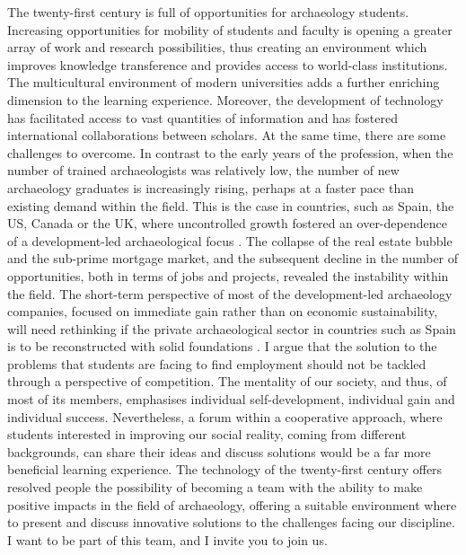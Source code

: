 The twenty-first century is full of opportunities for archaeology students. Increasing opportunities for mobility of students and faculty is opening a greater array of work and research possibilities, thus creating an environment which improves knowledge transference and provides access to world-class institutions. The multicultural environment of modern universities adds a further enriching dimension to the learning experience. Moreover, the development of technology has facilitated access to vast quantities of information and has fostered international collaborations between scholars. At the same time, there are some challenges to overcome. In contrast to the early years of the profession, when the number of trained archaeologists was relatively low, the number of new archaeology graduates is increasingly rising, perhaps at a faster pace than existing demand within the field. This is the case in countries, such as Spain, the US, Canada or the UK, where uncontrolled growth fostered an over-dependence of a development-led archaeological focus \parencite{Aitchison_2009}. The collapse of the real estate bubble and the sub-prime mortgage market, and the subsequent decline in the number of opportunities, both in terms of jobs and projects, revealed the instability within the field. The short-term perspective of most of the development-led archaeology companies, focused on immediate gain rather than on economic sustainability, will need rethinking if the private archaeological sector in countries such as Spain is to be reconstructed with solid foundations \parencite{Hamilakis_2015}. I argue that the solution to the problems that students are facing to find employment should not be tackled through a perspective of competition. The mentality of our society, and thus, of most of its members, emphasises individual self-development, individual gain and individual success. Nevertheless, a forum within a cooperative approach, where students interested in improving our social reality, coming from different backgrounds, can share their ideas and discuss solutions would be a far more beneficial learning experience. The technology of the twenty-first century offers resolved people the possibility of becoming a team with the ability to make positive impacts in the field of archaeology, offering a suitable environment where to present and discuss innovative solutions to the challenges facing our discipline. I want to be part of this team, and I invite you to join us.

